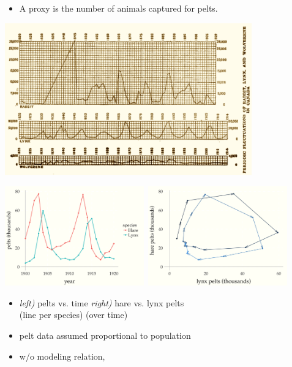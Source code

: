 \documentclass[9pt]{report}
\begin{document}
\begin{itemize}
  \item A proxy is the number of animals captured for pelts.
\end{itemize}
\begin{center}
  \includegraphics[width=0.8\textwidth]{img/hudons-bay-data.png}
\end{center}

\begin{center}
\includegraphics[width=0.45\textwidth]{img/lynx-hares-1.png}~\includegraphics[width=0.45\textwidth]{img/lynx-hares-2.png}
\end{center}
\begin{itemize}
\item {\it left)} pelts vs. time \hfill
{\it right)} hare vs. lynx pelts
\\
(line per species) \hfill (over time)
\item pelt data assumed proportional to population
\item w/o modeling relation, 
\end{itemize}
\end{document}

